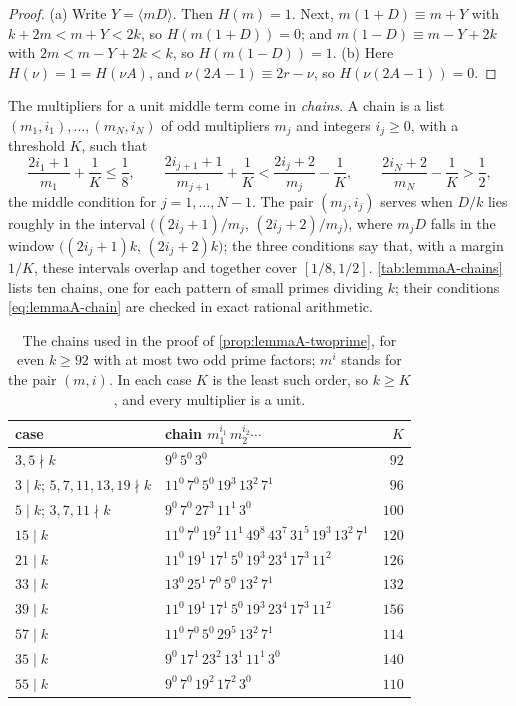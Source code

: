 \begin{proof}
(a) Write $Y=\langle mD\rangle$. Then $H(m)=1$. Next, $m(1+D)\equiv m+Y$ with
$k+2m<m+Y<2k$, so $H(m(1+D))=0$; and $m(1-D)\equiv m-Y+2k$ with
$2m<m-Y+2k<k$, so $H(m(1-D))=1$.
(b) Here $H(\nu)=1=H(\nu A)$, and $\nu(2A-1)\equiv2r-\nu$, so
$H(\nu(2A-1))=0$.
\end{proof}

The multipliers for a unit middle term come in \emph{chains}. A chain is a
list $(m_1,i_1),\dots,(m_N,i_N)$ of odd multipliers $m_j$ and integers
$i_j\ge0$, with a threshold $K$, such that
\begin{equation}
\frac{2i_1+1}{m_1}+\frac1K\le\frac18,\qquad
\frac{2i_{j+1}+1}{m_{j+1}}+\frac1K<\frac{2i_j+2}{m_j}-\frac1K,\qquad
\frac{2i_N+2}{m_N}-\frac1K>\frac12 ,
\label{eq:lemmaA-chain}
\end{equation}
the middle condition for $j=1,\dots,N-1$. The pair $(m_j,i_j)$ serves when
$D/k$ lies roughly in the interval $\bigl((2i_j+1)/m_j,\,(2i_j+2)/m_j\bigr)$,
where $m_jD$ falls in the window $\bigl((2i_j+1)k,\,(2i_j+2)k\bigr)$; the three
conditions say that, with a margin $1/K$, these intervals overlap and together
cover $[1/8,1/2]$. \autoref{tab:lemmaA-chains} lists
ten chains, one for each pattern of small primes dividing $k$; their
conditions \eqref{eq:lemmaA-chain} are checked in exact rational arithmetic.

\begin{table}
\centering
\small
\begin{tabular}{llr}
case & chain $m_1^{i_1}\,m_2^{i_2}\cdots$ & $K$\\\hline
$3,5\nmid k$ & $9^0\,5^0\,3^0$ & $92$\\
$3\mid k$; $5,7,11,13,19\nmid k$ & $11^0\,7^0\,5^0\,19^3\,13^2\,7^1$ & $96$\\
$5\mid k$; $3,7,11\nmid k$ & $9^0\,7^0\,27^3\,11^1\,3^0$ & $100$\\
$15\mid k$ & $11^0\,7^0\,19^2\,11^1\,49^8\,43^7\,31^5\,19^3\,13^2\,7^1$ & $120$\\
$21\mid k$ & $11^0\,19^1\,17^1\,5^0\,19^3\,23^4\,17^3\,11^2$ & $126$\\
$33\mid k$ & $13^0\,25^1\,7^0\,5^0\,13^2\,7^1$ & $132$\\
$39\mid k$ & $11^0\,19^1\,17^1\,5^0\,19^3\,23^4\,17^3\,11^2$ & $156$\\
$57\mid k$ & $11^0\,7^0\,5^0\,29^5\,13^2\,7^1$ & $114$\\
$35\mid k$ & $9^0\,17^1\,23^2\,13^1\,11^1\,3^0$ & $140$\\
$55\mid k$ & $9^0\,7^0\,19^2\,17^2\,3^0$ & $110$
\end{tabular}
\caption{The chains used in the proof of \autoref{prop:lemmaA-twoprime}, for
even $k\ge92$ with at most two odd prime factors; $m^i$ stands for the pair
$(m,i)$. In each case $K$ is the least such order, so $k\ge K$, and every
multiplier is a unit.}
\label{tab:lemmaA-chains}
\end{table}

